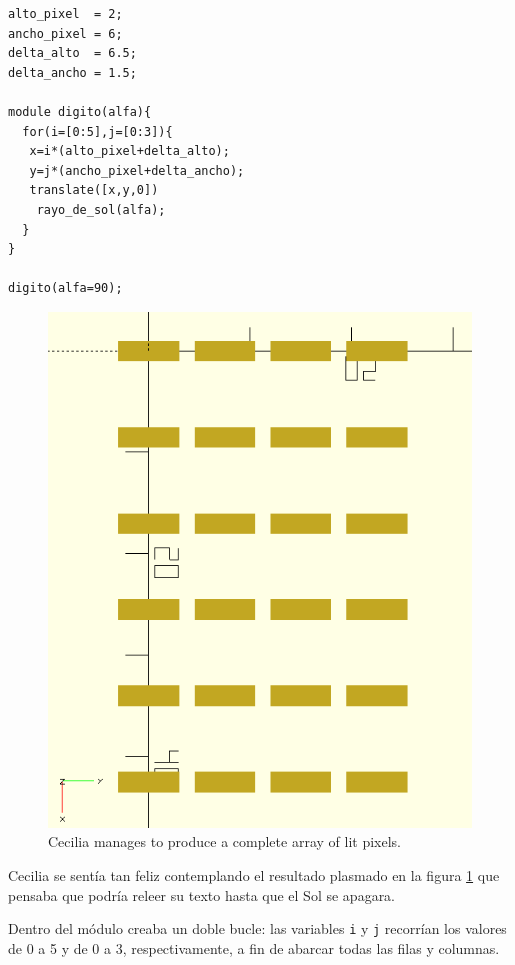     \begin{lstlisting}
alto_pixel  = 2;
ancho_pixel = 6;      
delta_alto  = 6.5;
delta_ancho = 1.5;

module digito(alfa){
  for(i=[0:5],j=[0:3]){
   x=i*(alto_pixel+delta_alto);
   y=j*(ancho_pixel+delta_ancho);
   translate([x,y,0])
    rayo_de_sol(alfa);
  }
}

digito(alfa=90);
    \end{lstlisting}

    \begin{figure}[ht]
      \centering
    \includegraphics[width=.4\textwidth]{imagenes/matriz-completa}  
    \caption{Cecilia manages to produce a complete array of lit pixels.}
      \label{fig:matriz-completa}
    \end{figure}
    



    Cecilia se sentía tan feliz contemplando el resultado plasmado en
    la figura \ref{fig:matriz-completa} que pensaba que podría releer
    su texto hasta que el Sol se
    apagara. %

    Dentro del módulo creaba un doble bucle: las variables \texttt{i}
    y \texttt{j} recorrían los valores de 0 a 5 y de 0 a 3,
    respectivamente, a fin de abarcar todas las filas y columnas.

